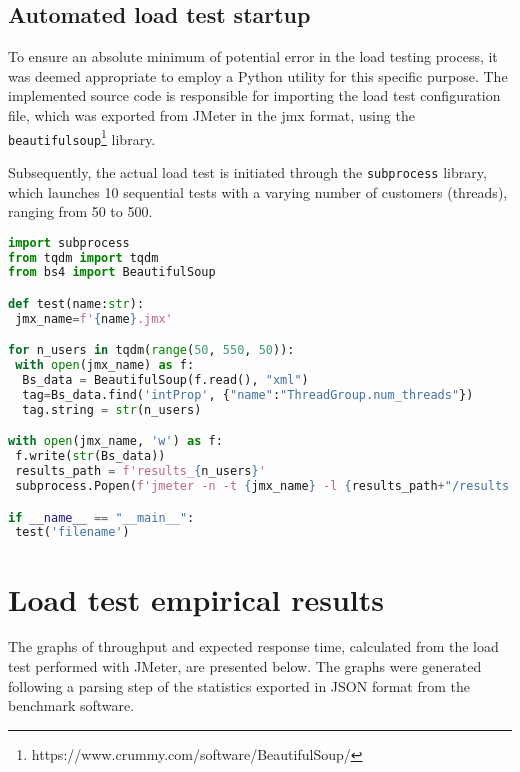 \subsection{Automated load test startup}

To ensure an absolute minimum of potential error in the load testing process, it was deemed appropriate to employ a Python utility for this specific purpose. 
The implemented source code is responsible for importing the load test configuration file, which was exported from JMeter in the jmx format, using the \verb|beautifulsoup|\footnote[2]{https://www.crummy.com/software/BeautifulSoup/} library.

Subsequently, the actual load test is initiated through the \verb|subprocess| library, which launches 10 sequential tests with a varying number of customers (threads), ranging from 50 to 500.

\vspace{8mm}

\begin{lstlisting}[language=Python, caption={Python script for automated load test startup}, label={lst:python-script}]
import subprocess
from tqdm import tqdm
from bs4 import BeautifulSoup

def test(name:str):
 jmx_name=f'{name}.jmx'

for n_users in tqdm(range(50, 550, 50)):      
 with open(jmx_name) as f:
  Bs_data = BeautifulSoup(f.read(), "xml")
  tag=Bs_data.find('intProp', {"name":"ThreadGroup.num_threads"})
  tag.string = str(n_users)

with open(jmx_name, 'w') as f:
 f.write(str(Bs_data))
 results_path = f'results_{n_users}'
 subprocess.Popen(f'jmeter -n -t {jmx_name} -l {results_path+"/results.csv"} -e -o {results_path}', shell=True, stdout=subprocess.DEVNULL).wait()

if __name__ == "__main__":
 test('filename')
\end{lstlisting}

\section{Load test empirical results}

The graphs of throughput and expected response time, calculated from the load test performed with JMeter, are presented below.
The graphs were generated following a parsing step of the statistics exported in JSON format from the benchmark software.

\clearpage

